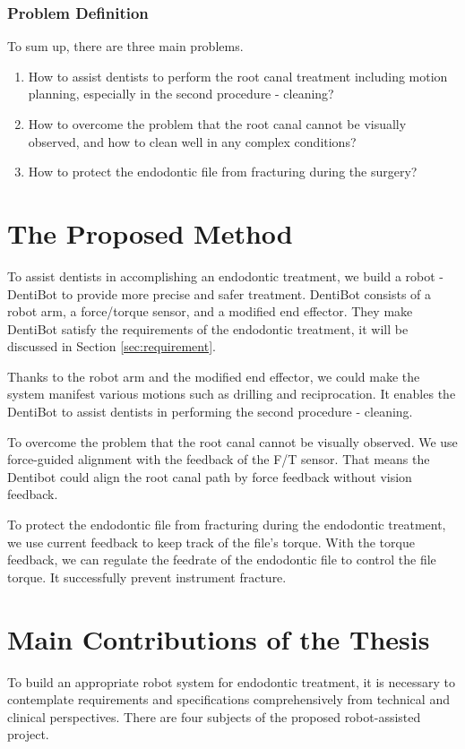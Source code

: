 \subsubsection{Problem Definition}
\hspace*{6mm}To sum up, there are three main problems.
\begin{enumerate}
\item How to assist dentists to perform the root canal treatment including motion planning, especially in the second procedure - cleaning?
\item How to overcome the problem that the root canal cannot be visually observed, and how to clean well in any complex conditions?
\item How to protect the endodontic file from fracturing during the surgery?
\end{enumerate}	
\section{The Proposed Method}
\hspace*{6mm}To assist dentists in accomplishing an endodontic treatment, we build a robot - DentiBot to provide more precise and safer treatment. DentiBot consists of a robot arm, a force/torque sensor, and a modified end effector. They make DentiBot satisfy the requirements of the endodontic treatment, it will be discussed in Section \ref{sec:requirement}. 
\par
Thanks to the robot arm and the modified end effector, we could make the system manifest various motions such as drilling and reciprocation. It enables the DentiBot to assist dentists in performing the second procedure - cleaning.
\par
To overcome the problem that the root canal cannot be visually observed. We use force-guided alignment with the feedback of the F/T sensor. That means the Dentibot could align the root canal path by force feedback without vision feedback.
\par
To protect the endodontic file from fracturing during the endodontic treatment, we use current feedback to keep track of the file's torque. With the torque feedback, we can regulate the feedrate of the endodontic file to control the file torque. It successfully prevent instrument fracture.
\section{Main Contributions of the Thesis}
\label{sec:contributions}
\hspace*{6mm}To build an appropriate robot system for endodontic treatment, it is necessary to contemplate requirements and specifications comprehensively from technical and clinical perspectives. There are four subjects of the proposed robot-assisted project. 
